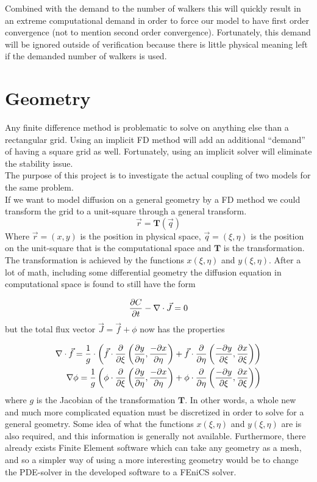Combined with the demand to the number of walkers this will quickly result in an extreme computational demand in order to force our model to have first order convergence (not to mention second order convergence). 
Fortunately, this demand will be ignored outside of verification because there is little physical meaning left if the demanded number of walkers is used.

\section{Geometry}\label{geometry}
Any finite difference method is problematic to solve on anything else than a rectangular grid. 
Using an implicit FD method will add an additional ``demand'' of having a square grid as well. 
Fortunately, using an implicit solver will eliminate the stability issue. \\
The purpose of this project is to investigate the actual coupling of two models for the same problem. \\
If we want to model diffusion on a general geometry by a FD method we could transform the grid to a unit-square through a general transform.
\begin{equation*}
 \vec{r} = \mathbf{T}(\vec{q})
\end{equation*}
Where $\vec{r} = (x,y)$ is the position in physical space, $\vec{q} = (\xi,\eta)$ is the position on the unit-square that is the computational space and $\mathbf{T}$  is the transformation. The transformation is achieved by the functions $x(\xi,\eta)$ and $y(\xi,\eta)$. 
After a lot of math, including some differential geometry the diffusion equation in computational space is found to still have the form

\begin{equation*}
 \frac{\partial C}{\partial t} -\nabla\cdot\vec{J} = 0
\end{equation*}
but the total flux vector $\vec{J} = \vec{f} + \phi$ now has the properties

\begin{align*}
 \nabla\cdot\vec{f} = \frac{1}{g}\cdot\left(\vec{f}\cdot\frac{\partial}{\partial\xi}\left(\frac{\partial y}{\partial\eta},\frac{-\partial x}{\partial \eta}\right) + \vec{f}\cdot\frac{\partial}{\partial\eta}\left(\frac{-\partial y}{\partial\xi},\frac{\partial x}{\partial \xi}\right)\right) \\
 \nabla\phi = \frac{1}{g}\left(\phi\cdot\frac{\partial}{\partial\xi}\left(\frac{\partial y}{\partial\eta},\frac{-\partial x}{\partial\eta}\right)+\phi\cdot\frac{\partial}{\partial\eta}\left(\frac{-\partial y}{\partial\xi},\frac{\partial x}{\partial\xi}\right)\right)
\end{align*}
where $g$ is the Jacobian of the transformation $\mathbf{T}$. 
In other words, a whole new and much more complicated equation must be discretized in order to solve for a general geometry. 
Some idea of what the functions $x(\xi,\eta)$ and $y(\xi,\eta)$ are is also required, and this information is generally not available. 
Furthermore, there already exists Finite Element software which can take any geometry as a mesh, and so a simpler way of using a more interesting geometry would be to change the PDE-solver in the developed software to a FEniCS solver.
